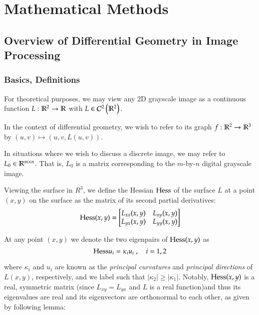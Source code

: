 \chapter{Mathematical Methods}

\section{Overview of Differential Geometry in Image Processing}
	\subsection{Basics, Definitions}
        \begin{defn}
    	For theoretical purposes, we may view any 2D grayscale image
    	as a continuous function $L: \mathbb{R}^2 \to \mathbb{R}$
        with $L \in \mathcal{C}^2\left(\mathbb{R}^2\right).$
        \end{defn}
        \begin{defn}
        In the context of differential geometry, we wish to refer to its graph
            $f: \mathbb{R}^2 \to \mathbb{R}^3 $ by $ (u,v) \mapsto (u, v, L(u,v))$.
    	\end{defn}
        \begin{defn}
    In situations where we wish to discuss a discrete image, we may refer to
	$L_0 \in \mathbb{R}^{m\times n}$. That is, $L_0$ is a matrix corresponding to the $m$-by-$n$ digital grayscale image. 
    \end{defn}
	
	
	Viewing the surface in $R^3$, we define the Hessian $\mathrm{Hess}$ of the surface $L$
	at a point $(x,y)$ on the surface as the matrix of its second partial derivatives:
	\begin{equation}
\mathrm{Hess}(x,y) = \begin{bmatrix}
		L_{xx}(x,y) & L_{xy}(x,y) \\
		L_{yx}(x,y) & L_{yy}(x,y)
	\end{bmatrix}
	\end{equation}
	
	At any point $(x,y)$ we denote the two eigenpairs of $\mathrm{Hess}(x,y)$ as
	\begin{equation}
		\mathrm{Hess} u_i = \kappa_i u_i \; , \quad i = 1,2
	\end{equation}
	
	where $\kappa_i$ and $u_i$ are known as the
	\textit{principal curvatures} and \textit{principal directions} of $L(x,y)$, respectively, and we label such that $|\kappa_2| \ge |\kappa_1|$. Notably, $\mathrm{Hess}(x,y)$ is a real, symmetric matrix (since  $L_{xy} = L_{yx}$ and $L$ is a real function)and thus its eigenvalues are real and its eigenvectors are orthonormal to each other, as given by following lemma:
	

